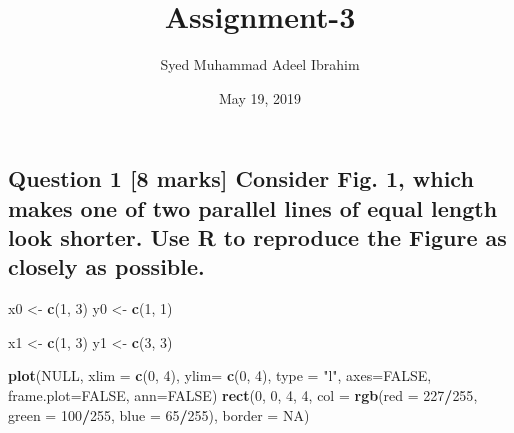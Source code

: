 \documentclass[]{article}
\title{Assignment-3}
\author{Syed Muhammad Adeel Ibrahim}
\date{May 19, 2019}
\newenvironment{Shaded}{\begin{snugshade}}{\end{snugshade}}
\newcommand{\KeywordTok}[1]{\textcolor[rgb]{0.13,0.29,0.53}{\textbf{#1}}}
\newcommand{\DataTypeTok}[1]{\textcolor[rgb]{0.13,0.29,0.53}{#1}}
\newcommand{\DecValTok}[1]{\textcolor[rgb]{0.00,0.00,0.81}{#1}}
\newcommand{\StringTok}[1]{\textcolor[rgb]{0.31,0.60,0.02}{#1}}
\newcommand{\OtherTok}[1]{\textcolor[rgb]{0.56,0.35,0.01}{#1}}
\newcommand{\OperatorTok}[1]{\textcolor[rgb]{0.81,0.36,0.00}{\textbf{#1}}}
\newcommand{\NormalTok}[1]{#1}
\begin{document}
\maketitle

\subsection{Question 1 {[}8 marks{]} Consider Fig. 1, which makes one of
two parallel lines of equal length look shorter. Use R to reproduce the
Figure as closely as
possible.}\label{question-1-8-marks-consider-fig.-1-which-makes-one-of-two-parallel-lines-of-equal-length-look-shorter.-use-r-to-reproduce-the-figure-as-closely-as-possible.}

\begin{Shaded}
\begin{Highlighting}[]
\NormalTok{x0 <-}\StringTok{ }\KeywordTok{c}\NormalTok{(}\DecValTok{1}\NormalTok{, }\DecValTok{3}\NormalTok{)}
\NormalTok{y0 <-}\StringTok{ }\KeywordTok{c}\NormalTok{(}\DecValTok{1}\NormalTok{, }\DecValTok{1}\NormalTok{)}

\NormalTok{x1 <-}\StringTok{ }\KeywordTok{c}\NormalTok{(}\DecValTok{1}\NormalTok{, }\DecValTok{3}\NormalTok{)}
\NormalTok{y1 <-}\StringTok{ }\KeywordTok{c}\NormalTok{(}\DecValTok{3}\NormalTok{, }\DecValTok{3}\NormalTok{)}

\KeywordTok{plot}\NormalTok{(}\OtherTok{NULL}\NormalTok{, }\DataTypeTok{xlim =} \KeywordTok{c}\NormalTok{(}\DecValTok{0}\NormalTok{, }\DecValTok{4}\NormalTok{), }\DataTypeTok{ylim=} \KeywordTok{c}\NormalTok{(}\DecValTok{0}\NormalTok{, }\DecValTok{4}\NormalTok{), }\DataTypeTok{type =} \StringTok{"l"}\NormalTok{, }\DataTypeTok{axes=}\OtherTok{FALSE}\NormalTok{, }\DataTypeTok{frame.plot=}\OtherTok{FALSE}\NormalTok{, }\DataTypeTok{ann=}\OtherTok{FALSE}\NormalTok{)}
\KeywordTok{rect}\NormalTok{(}\DecValTok{0}\NormalTok{, }\DecValTok{0}\NormalTok{, }\DecValTok{4}\NormalTok{, }\DecValTok{4}\NormalTok{, }\DataTypeTok{col =} \KeywordTok{rgb}\NormalTok{(}\DataTypeTok{red =} \DecValTok{227}\OperatorTok{/}\DecValTok{255}\NormalTok{, }\DataTypeTok{green =} \DecValTok{100}\OperatorTok{/}\DecValTok{255}\NormalTok{, }\DataTypeTok{blue =} \DecValTok{65}\OperatorTok{/}\DecValTok{255}\NormalTok{), }\DataTypeTok{border =} \OtherTok{NA}\NormalTok{)}



\end{Highlighting}
\end{Shaded}
\end{document}
